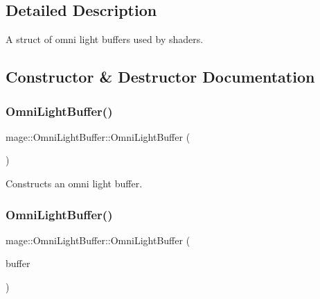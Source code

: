 \subsection{Detailed Description}
A struct of omni light buffers used by shaders. 

\subsection{Constructor \& Destructor Documentation}
\hypertarget{structmage_1_1_omni_light_buffer_a2cb95cb8ba07182d04b610b1c4c49be1}{}\label{structmage_1_1_omni_light_buffer_a2cb95cb8ba07182d04b610b1c4c49be1} 
\subsubsection{\texorpdfstring{Omni\+Light\+Buffer()}{OmniLightBuffer()}\hspace{0.1cm}{\footnotesize\ttfamily [1/3]}}
{\footnotesize\ttfamily mage\+::\+Omni\+Light\+Buffer\+::\+Omni\+Light\+Buffer (\begin{DoxyParamCaption}{ }\end{DoxyParamCaption})}

Constructs an omni light buffer. \hypertarget{structmage_1_1_omni_light_buffer_a199a9a711584abfe7576037ea479eccd}{}\label{structmage_1_1_omni_light_buffer_a199a9a711584abfe7576037ea479eccd} 
\subsubsection{\texorpdfstring{Omni\+Light\+Buffer()}{OmniLightBuffer()}\hspace{0.1cm}{\footnotesize\ttfamily [2/3]}}
{\footnotesize\ttfamily mage\+::\+Omni\+Light\+Buffer\+::\+Omni\+Light\+Buffer (\begin{DoxyParamCaption}\item[{const \hyperlink{structmage_1_1_omni_light_buffer}{Omni\+Light\+Buffer} \&}]{buffer }\end{DoxyParamCaption})\hspace{0.3cm}{\ttfamily [default]}}

